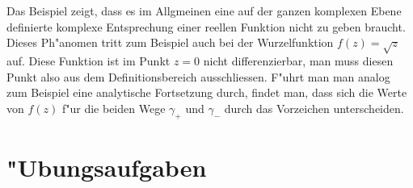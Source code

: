 Das Beispiel zeigt, dass es im Allgmeinen eine auf der ganzen komplexen
Ebene definierte komplexe Entsprechung einer reellen Funktion nicht
zu geben braucht.
Dieses Ph"anomen tritt zum Beispiel auch bei der Wurzelfunktion $f(z)=\sqrt{z}$
auf.
Diese Funktion ist im Punkt $z=0$ nicht differenzierbar, man muss diesen
Punkt also aus dem Definitionsbereich ausschliessen.
F"uhrt man man analog zum Beispiel eine analytische Fortsetzung durch,
findet man, dass sich die Werte von $f(z)$ f"ur die beiden Wege $\gamma_+$
und $\gamma_-$ durch das Vorzeichen unterscheiden.

\section{"Ubungsaufgaben}
\begin{uebungsaufgaben}
\item

\item

\end{uebungsaufgaben}

